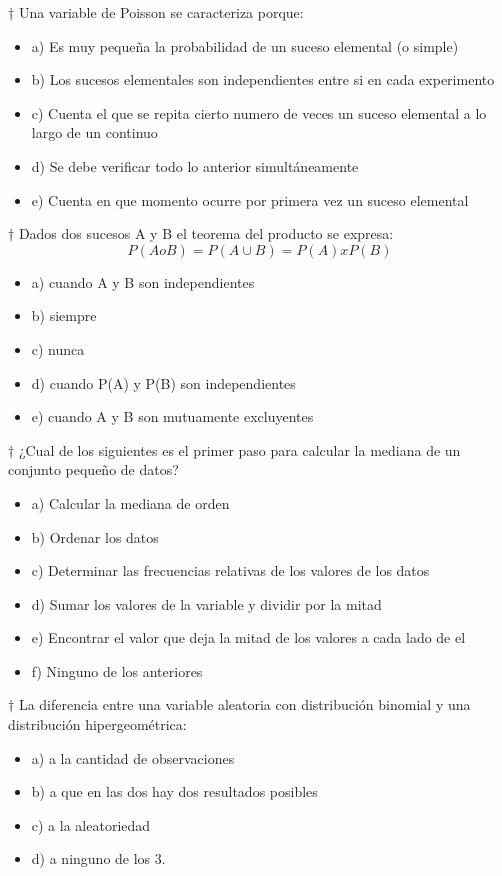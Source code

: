 \documentclass[10pt,a4paper]{article}
\begin{document}
$\dagger$ Una variable de Poisson se caracteriza porque:
\begin{itemize}
	\item a) Es muy pequeña la probabilidad de un suceso elemental (o simple)
	\item b) Los sucesos elementales son independientes entre si en cada experimento
	\item c) Cuenta el que se repita cierto numero de veces un suceso elemental a lo largo de un continuo
	\item d) Se debe verificar todo lo anterior simultáneamente
	\item e) Cuenta en que momento ocurre por primera vez un suceso elemental
\end{itemize}

$\dagger$ Dados dos sucesos A y B el teorema del producto se expresa:
\begin{equation}
	P(A o B) = P(A \cup B) = P(A)xP(B)
\end{equation}
\begin{itemize}
	\item a) cuando A y B son independientes
	\item b) siempre
	\item c) nunca
	\item d) cuando P(A) y P(B) son independientes
	\item e) cuando A y B son mutuamente excluyentes
\end{itemize}

$\dagger$ ¿Cual de los siguientes es el primer paso para calcular la mediana de un conjunto pequeño de datos?
\begin{itemize}
	\item a) Calcular la mediana de orden
	\item b) Ordenar los datos
	\item c) Determinar las frecuencias relativas de los valores de los datos
	\item d) Sumar los valores de la variable y dividir por la mitad
	\item e) Encontrar el valor que deja la mitad de los valores a cada lado de el
	\item f) Ninguno de los anteriores
\end{itemize}

$\dagger$ La diferencia entre una variable aleatoria con distribución binomial y una distribución hipergeométrica:
\begin{itemize}
	\item a) a la cantidad de observaciones
	\item b) a que en las dos hay dos resultados posibles
	\item c) a la aleatoriedad
	\item d) a ninguno de los 3.
\end{itemize}
\end{document}
